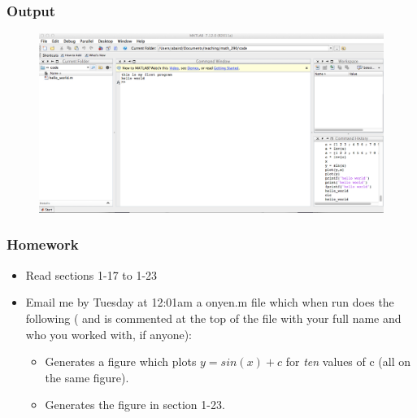 \documentclass{beamer}
\newcommand{\I}{\textit}
\begin{document}
\begin{frame}
\frametitle{Output} 

\begin{figure}
\includegraphics[width=\textwidth, height= 0.8\textheight]{./pictures/output}
\end{figure}
\end{frame}



\begin{frame}

\frametitle{Homework} 
\begin{itemize} 
\item Read sections 1-17 to 1-23
\item Email me by Tuesday at 12:01am a onyen.m file which when run does the following ( and is commented at the top of the file with your full name and who you worked with, if anyone): 
\begin{itemize}
\item Generates a figure which plots $ y = sin(x)+c$ for \I{ten} values of c (all on the same figure). 
\item Generates the figure in section 1-23.
\end{itemize}
\end{itemize}

\end{frame}
\end{document}
